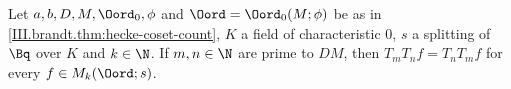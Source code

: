 Let $a,b,D,M,\Oord_0,\phi$ and $\Oord=\Oord_0(M;\phi)$ be as in \cref{III.brandt.thm:hecke-coset-count}, $K$ a field of characteristic $0$, $s$ a
splitting of $\Bq$ over $K$ and $k\in\N$. If $m,n\in\N$ are prime to $DM$, then $T_mT_nf=T_nT_mf$ for every $f\in M_k(\Oord;s)$.
